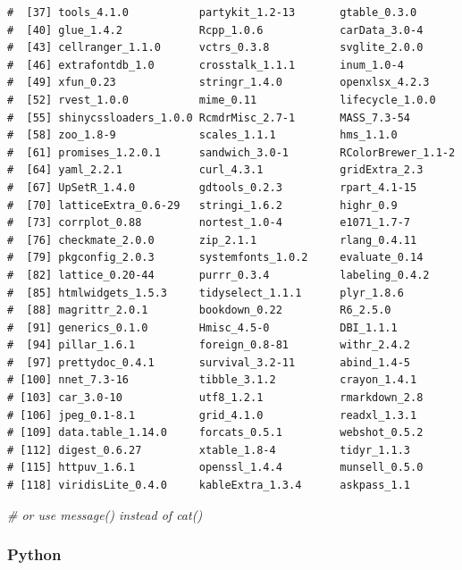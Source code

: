 \documentclass[
  12pt,
]{article}
\newenvironment{Shaded}{\begin{snugshade}}{\end{snugshade}}
\newcommand{\CommentTok}[1]{\textcolor[rgb]{0.56,0.35,0.01}{\textit{#1}}}
\begin{document}
\begin{verbatim}
#  [37] tools_4.1.0           partykit_1.2-13       gtable_0.3.0          
#  [40] glue_1.4.2            Rcpp_1.0.6            carData_3.0-4         
#  [43] cellranger_1.1.0      vctrs_0.3.8           svglite_2.0.0         
#  [46] extrafontdb_1.0       crosstalk_1.1.1       inum_1.0-4            
#  [49] xfun_0.23             stringr_1.4.0         openxlsx_4.2.3        
#  [52] rvest_1.0.0           mime_0.11             lifecycle_1.0.0       
#  [55] shinycssloaders_1.0.0 RcmdrMisc_2.7-1       MASS_7.3-54           
#  [58] zoo_1.8-9             scales_1.1.1          hms_1.1.0             
#  [61] promises_1.2.0.1      sandwich_3.0-1        RColorBrewer_1.1-2    
#  [64] yaml_2.2.1            curl_4.3.1            gridExtra_2.3         
#  [67] UpSetR_1.4.0          gdtools_0.2.3         rpart_4.1-15          
#  [70] latticeExtra_0.6-29   stringi_1.6.2         highr_0.9             
#  [73] corrplot_0.88         nortest_1.0-4         e1071_1.7-7           
#  [76] checkmate_2.0.0       zip_2.1.1             rlang_0.4.11          
#  [79] pkgconfig_2.0.3       systemfonts_1.0.2     evaluate_0.14         
#  [82] lattice_0.20-44       purrr_0.3.4           labeling_0.4.2        
#  [85] htmlwidgets_1.5.3     tidyselect_1.1.1      plyr_1.8.6            
#  [88] magrittr_2.0.1        bookdown_0.22         R6_2.5.0              
#  [91] generics_0.1.0        Hmisc_4.5-0           DBI_1.1.1             
#  [94] pillar_1.6.1          foreign_0.8-81        withr_2.4.2           
#  [97] prettydoc_0.4.1       survival_3.2-11       abind_1.4-5           
# [100] nnet_7.3-16           tibble_3.1.2          crayon_1.4.1          
# [103] car_3.0-10            utf8_1.2.1            rmarkdown_2.8         
# [106] jpeg_0.1-8.1          grid_4.1.0            readxl_1.3.1          
# [109] data.table_1.14.0     forcats_0.5.1         webshot_0.5.2         
# [112] digest_0.6.27         xtable_1.8-4          tidyr_1.1.3           
# [115] httpuv_1.6.1          openssl_1.4.4         munsell_0.5.0         
# [118] viridisLite_0.4.0     kableExtra_1.3.4      askpass_1.1           
\end{verbatim}

\begin{Shaded}
\begin{Highlighting}[]
  \CommentTok{\# or use message() instead of cat()}
\end{Highlighting}
\end{Shaded}

\hypertarget{python-1}{%
\subsubsection{Python}\label{python-1}}
\end{document}
